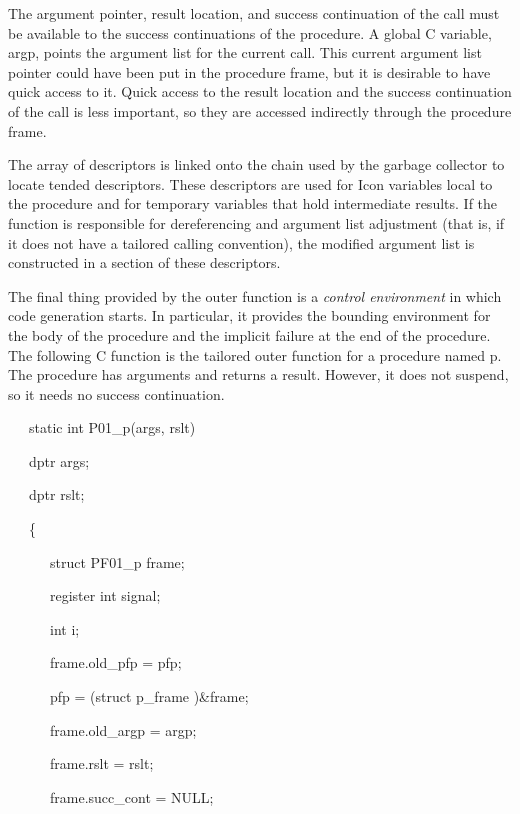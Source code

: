 The argument pointer, result location, and success continuation of the
call must be available to the success continuations of the
procedure. A global C variable, argp, points the argument list for the
current call. This current argument list pointer could have been put
in the procedure frame, but it is desirable to have quick access to
it. Quick access to the result location and the success continuation
of the call is less important, so they are accessed indirectly through
the procedure frame.

The array of descriptors is linked onto the chain used by the garbage
collector to locate tended descriptors. These descriptors are used for
Icon variables local to the procedure and for temporary variables that
hold intermediate results. If the function is responsible for
dereferencing and argument list adjustment (that is, if it does not
have a tailored calling convention), the modified argument list is
constructed in a section of these descriptors.

The final thing provided by the outer function is a \textit{control
environment} in which code generation starts. In particular, it
provides the bounding environment for the body of the procedure and
the implicit failure at the end of the procedure. The following C
function is the tailored outer function for a procedure named p. The
procedure has arguments and returns a result. However, it does not
suspend, so it needs no success continuation.

{\ttfamily\mdseries
\ \ \ static int P01\_p(args, rslt)}

{\ttfamily\mdseries
\ \ \ dptr args;}

{\ttfamily\mdseries
\ \ \ dptr rslt;}

{\ttfamily\mdseries
\ \ \ \{}

{\ttfamily\mdseries
\ \ \ \ \ \ struct PF01\_p frame;}

{\ttfamily\mdseries
\ \ \ \ \ \ register int signal;}

{\ttfamily\mdseries
\ \ \ \ \ \ int i;}

{\ttfamily\mdseries
\ \ \ \ \ \ frame.old\_pfp = pfp;}

{\ttfamily\mdseries
\ \ \ \ \ \ pfp = (struct p\_frame )\&frame;}

{\ttfamily\mdseries
\ \ \ \ \ \ frame.old\_argp = argp;}

{\ttfamily\mdseries
\ \ \ \ \ \ frame.rslt = rslt;}

{\ttfamily\mdseries
\ \ \ \ \ \ frame.succ\_cont = NULL;}


